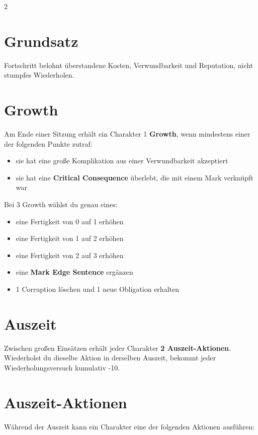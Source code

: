 \label{ch:fortschritt}

\begin{multicols*}{2}
\section{Grundsatz}
Fortschritt belohnt überstandene Kosten, Verwundbarkeit und Reputation, nicht stumpfes Wiederholen.

\section{Growth}
Am Ende einer Sitzung erhält ein Charakter 1 \textbf{Growth}, wenn mindestens einer der folgenden Punkte zutraf:
\begin{itemize}[leftmargin=*]
\item sie hat eine große Komplikation aus einer Verwundbarkeit akzeptiert
\item sie hat eine \textbf{Critical Consequence} überlebt, die mit einem Mark verknüpft war
\end{itemize}

Bei 3 Growth wählst du genau eines:
\begin{itemize}[leftmargin=*]
\item eine Fertigkeit von 0 auf 1 erhöhen
\item eine Fertigkeit von 1 auf 2 erhöhen
\item eine Fertigkeit von 2 auf 3 erhöhen
\item eine \textbf{Mark Edge Sentence} ergänzen
\item 1 Corruption löschen und 1 neue Obligation erhalten
\end{itemize}

\section{Auszeit}
Zwischen großen Einsätzen erhält jeder Charakter \textbf{2 Auszeit-Aktionen}.
Wiederholst du dieselbe Aktion in derselben Auszeit, bekommt jeder Wiederholungsversuch kumulativ -10.

\section{Auszeit-Aktionen}

Während der Auszeit kann ein Charakter eine der folgenden Aktionen ausführen:


\end{multicols*}
